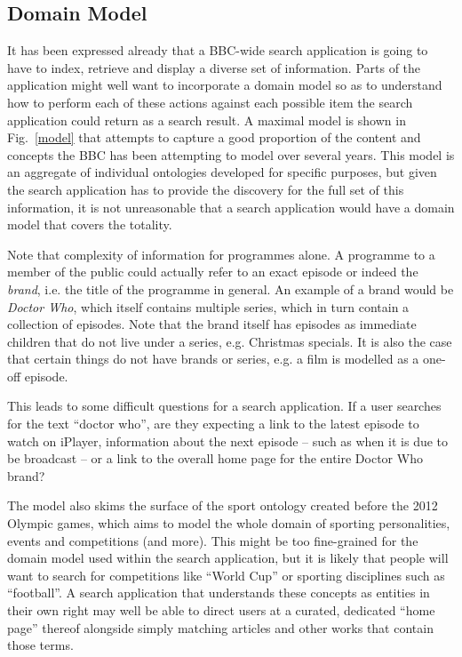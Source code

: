\documentclass[oribibl]{llncs}
\begin{document}
\subsection{Domain Model}

It has been expressed already that a BBC-wide search application
is going to have to index, retrieve and display a diverse set of
information. Parts of the application might well want to incorporate
a domain model \citep{fowler2002patterns} so as to understand how
to perform each of these actions against each possible item
the search application could return as a search result. A maximal
model is shown in Fig.~\ref{model} that attempts to capture
a good proportion of the content and concepts the BBC has
been attempting to model over several years. This model is
an aggregate of individual ontologies developed for specific purposes,
but given the search application has to provide the discovery for
the full set of this information, it is not unreasonable that
a search application would have a domain model that covers the totality.

Note that complexity of information for programmes alone. \citep{raimond2009bbc}
A programme to a member of the public could actually refer to an
exact episode or indeed the \emph{brand}, i.e. the title of the programme
in general. An example of a brand would be
\emph{Doctor Who}, which itself contains multiple series, which in turn
contain a collection of episodes. Note that the brand itself has episodes
as immediate children that do not live under a series, e.g. Christmas specials.
It is also the case that certain things do not have brands or series, e.g.
a film is modelled as a one-off episode.

This leads to some difficult questions for a search application. If a user
searches for the text ``doctor who'', are they expecting a link to the
latest episode to watch on iPlayer, information about the next episode
-- such as when it is due to be broadcast -- or a link to the overall
home page for the entire Doctor Who brand?

The model also skims the surface of the sport ontology \citep{rayfield2011bbc}
created before the 2012 Olympic games, which aims to model the whole domain
of sporting personalities, events and competitions (and more). This might
be too fine-grained for the domain model used within the search application,
but it is likely that people will want to search for competitions like
``World Cup'' or sporting disciplines such as ``football''. A search application
that understands these concepts as entities in their own right may well
be able to direct users at a curated, dedicated ``home page'' thereof alongside
simply matching articles and other works that contain those terms.
\end{document}
